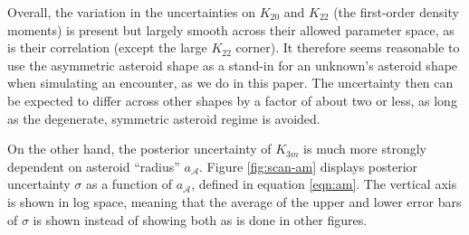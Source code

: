 \documentclass[fleqn,usenatbib]{mnras}
\begin{document}
Overall, the variation in the uncertainties on $K_{20}$ and $K_{22}$ (the first-order density moments) is present but largely smooth across their allowed parameter space, as is their correlation (except the large $K_{22}$ corner). It therefore seems reasonable to use the asymmetric asteroid shape as a stand-in for an unknown's asteroid shape when simulating an encounter, as we do in this paper. The uncertainty then can be expected to differ across other shapes by a factor of about two or less, as long as the degenerate, symmetric asteroid regime is avoided.

On the other hand, the posterior uncertainty of $K_{3m}$ is much more strongly dependent on asteroid ``radius'' $a_\mathcal{A}$. Figure \ref{fig:scan-am} displays posterior uncertainty $\sigma$ as a function of $a_\mathcal{A}$, defined in equation \ref{eqn:am}. The vertical axis is shown in log space, meaning that the average of the upper and lower error bars of $\sigma$ is shown instead of showing both as is done in other figures.
\end{document}
